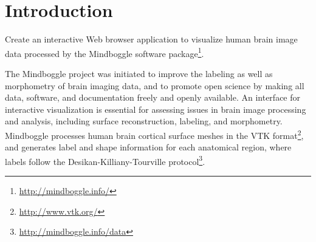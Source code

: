 \documentclass[twocolumn]{bmcart}%
\begin{document}
\begin{frontmatter}
\begin{fmbox}

	








%
\end{fmbox}%

\end{frontmatter}


\section{Introduction}\label{introduction}

Create an interactive Web browser application to visualize human brain
image data processed by the Mindboggle software
package\footnote{\url{http://mindboggle.info/}}.

The Mindboggle project was initiated to improve the labeling as well as
morphometry of brain imaging data, and to promote open science by making
all data, software, and documentation freely and openly available. An
interface for interactive visualization is essential for assessing
issues in brain image processing and analysis, including surface
reconstruction, labeling, and morphometry. Mindboggle processes human
brain cortical surface meshes in the VTK
format\footnote{\url{http://www.vtk.org/}}, and generates label and
shape information for each anatomical region, where labels follow the
Desikan-Killiany-Tourville
protocol\footnote{\url{http://mindboggle.info/data}}\cite{Klein2012}.
\end{document}

